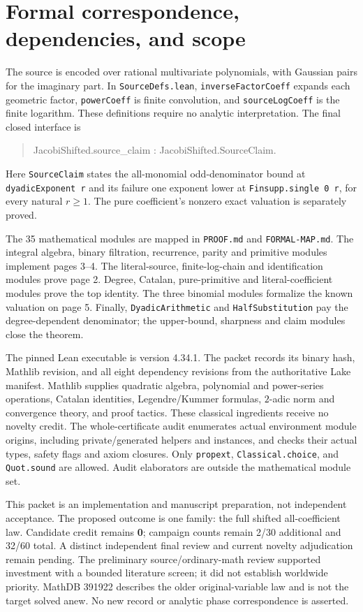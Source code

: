 \documentclass[11pt]{article}
\begin{document}
\newpage
\section{Formal correspondence, dependencies, and scope}
The source is encoded over rational multivariate polynomials, with Gaussian pairs for the imaginary part. In \texttt{SourceDefs.lean}, \texttt{inverseFactorCoeff} expands each geometric factor, \texttt{powerCoeff} is finite convolution, and \texttt{sourceLogCoeff} is the finite logarithm. These definitions require no analytic interpretation. The final closed interface is
\begin{quote}\ttfamily
 JacobiShifted.source\_claim : JacobiShifted.SourceClaim.
\end{quote}
Here \texttt{SourceClaim} states the all-monomial odd-denominator bound at \texttt{dyadicExponent r} and its failure one exponent lower at \texttt{Finsupp.single 0 r}, for every natural $r\ge1$. The pure coefficient's nonzero exact valuation is separately proved.

The 35 mathematical modules are mapped in \texttt{PROOF.md} and \texttt{FORMAL-MAP.md}. The integral algebra, binary filtration, recurrence, parity and primitive modules implement pages 3--4. The literal-source, finite-log-chain and identification modules prove page 2. Degree, Catalan, pure-primitive and literal-coefficient modules prove the top identity. The three binomial modules formalize the known valuation on page 5. Finally, \texttt{DyadicArithmetic} and \texttt{HalfSubstitution} pay the degree-dependent denominator; the upper-bound, sharpness and claim modules close the theorem.

The pinned Lean executable is version 4.34.1. The packet records its binary hash, Mathlib revision, and all eight dependency revisions from the authoritative Lake manifest. Mathlib supplies quadratic algebra, polynomial and power-series operations, Catalan identities, Legendre/Kummer formulas, $2$-adic norm and convergence theory, and proof tactics. These classical ingredients receive no novelty credit. The whole-certificate audit enumerates actual environment module origins, including private/generated helpers and instances, and checks their actual types, safety flags and axiom closures. Only \texttt{propext}, \texttt{Classical.choice}, and \texttt{Quot.sound} are allowed. Audit elaborators are outside the mathematical module set.

This packet is an implementation and manuscript preparation, not independent acceptance. The proposed outcome is one family: the full shifted all-coefficient law. Candidate credit remains \textbf{0}; campaign counts remain 2/30 additional and 32/60 total. A distinct independent final review and current novelty adjudication remain pending. The preliminary source/ordinary-math review supported investment with a bounded literature screen; it did not establish worldwide priority. MathDB 391922 describes the older original-variable law and is not the target solved anew. No new record or analytic phase correspondence is asserted.
\end{document}
